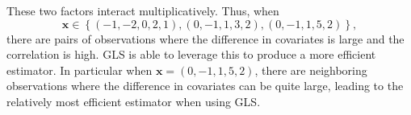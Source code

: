 \documentclass[11pt, letterpaper]{article}
\begin{document}
\begin{enumerate}[(a)]
\begin{description}
  These two factors interact multiplicatively. Thus, when
  \[\mathbf{x} \in \left\{ (-1,-2,0,2,1), (0,-1,1,3,2), (0,-1,1,5,2) \right\},\]
  there are pairs of observations where the difference in covariates is large
  and the correlation is high. GLS is able to leverage this to produce a more
  efficient estimator. In particular when $\mathbf{x} = (0,-1,1,5,2)$, there are
  neighboring observations where the difference in covariates can be quite
  large, leading to the relatively most efficient estimator when using GLS.
\end{description}
\end{enumerate} 
\end{document}
